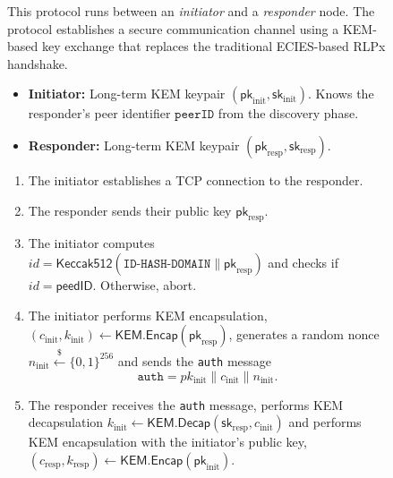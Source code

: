 \begin{figure}[!t]
\begin{tcolorbox}[
    enhanced jigsaw, 
    colframe=Black!90!white, colback=white, colbacktitle=Black!10!white, coltitle=Black, fonttitle=\bfseries,
    fontupper=\small,
    fontlower=\small,
    left=1pt,          %
    right=1pt,         %
    top=1pt,           %
    bottom=1pt         %
]
This protocol runs between an \emph{initiator} and a \emph{responder} node. The protocol establishes a secure communication channel using a KEM-based key exchange that replaces the traditional ECIES-based RLPx handshake.

\smallskip
\begin{itemize}[leftmargin=*]
    \item \textbf{Initiator:} Long-term KEM keypair $(\mathsf{pk}_{\text{init}}, \mathsf{sk}_{\text{init}})$. Knows the responder's peer identifier $\texttt{peerID}$ from the discovery phase.
    
    \item \textbf{Responder:} Long-term KEM keypair $(\mathsf{pk}_{\text{resp}}, \mathsf{sk}_{\text{resp}})$. 
\end{itemize}

\smallskip
{}
\begin{enumerate}[leftmargin=*]
\renewcommand{\labelenumi}{\arabic{enumi}.}
    \item The initiator establishes a TCP connection to the responder.
    
    \item The responder sends their public key $\mathsf{pk}_{\text{resp}}$.
    
    \item The initiator computes $id = \mathsf{Keccak512}(\texttt{ID-HASH-DOMAIN} \parallel \mathsf{pk}_{\text{resp}})$ and checks if $id = \mathsf{peedID}$. Otherwise, abort.    
    
    \item The initiator performs KEM encapsulation, $(c_{\text{init}}, k_{\text{init}}) \leftarrow \mathsf{KEM.Encap}(\mathsf{pk}_{\text{resp}})$, generates a random nonce $n_{\text{init}}\overset{\$}{\leftarrow} \{0,1\}^{256}$ and sends the \texttt{auth} message $$\texttt{auth} = pk_{\text{init}} \parallel c_{\text{init}} \parallel n_{\text{init}}.$$
    
    \item The responder receives the \texttt{auth} message, performs KEM decapsulation $k_{\text{init}} \leftarrow \mathsf{KEM.Decap}(\mathsf{sk}_{\text{resp}}, c_{\text{init}})$ and performs KEM encapsulation with the initiator's public key, $(c_{\text{resp}}, k_{\text{resp}}) \leftarrow \mathsf{KEM.Encap}(\mathsf{pk}_{\text{init}})$.
    

\end{enumerate}
\end{tcolorbox}
\end{figure}
